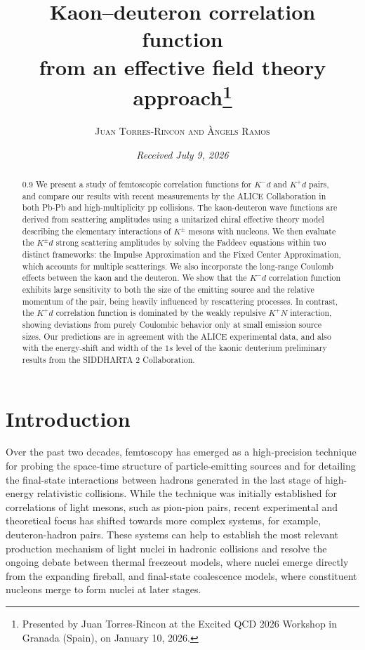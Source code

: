 \documentclass[12pt,a4paper]{article}
\title{\large \textbf{Kaon–deuteron correlation function \\ from an effective field theory approach\footnote{Presented by Juan Torres-Rincon at the Excited QCD 2026 Workshop in Granada
(Spain), on January 10, 2026.}}}
\author{\textsc{Juan Torres-Rincon and \`{A}ngels Ramos}}
\date{\normalsize \textit{Received July 9, 2026}}
\begin{document}
\maketitle
\begin{abstract}
\vspace{-4em}
\begin{spacing}{0.9}
We present a study of femtoscopic correlation functions for	$K^{-}d$ and $K^{+}d$ pairs, and compare our results with recent measurements by the ALICE Collaboration in both Pb-Pb and high-multiplicity pp collisions. The kaon-deuteron wave functions are derived from scattering amplitudes using a unitarized chiral effective theory model describing the elementary interactions of $K^{\pm}$ mesons with nucleons. We then evaluate the $K^{\pm}d$ strong scattering amplitudes by solving the Faddeev equations within two distinct frameworks: the Impulse Approximation and the Fixed Center Approximation, which accounts for multiple scatterings. We also incorporate the long-range Coulomb effects between the kaon and the deuteron. We show that the $K^{−}d$ correlation function exhibits large sensitivity to both the size of the emitting source and the relative momentum of the pair, being heavily influenced by rescattering processes. In contrast, the $K^{+}d$ correlation function is dominated by the weakly repulsive $K^{+}N$ interaction, showing
deviations from purely Coulombic behavior only at small emission source sizes. Our predictions are in agreement with the ALICE experimental data, and also with the energy-shift and width of the $1s$ level of the kaonic deuterium preliminary results from the SIDDHARTA 2 Collaboration.
\end{spacing}
\end{abstract}

\section{\normalsize {Introduction}}
Over the past two decades, femtoscopy has emerged as a high-precision technique for probing the space-time structure of particle-emitting sources and for detailing the final-state interactions between hadrons generated in the last stage of high-energy relativistic collisions. While the technique was initially established for correlations of light mesons, such as pion-pion pairs, recent experimental and theoretical focus has shifted towards more complex systems, for example, deuteron-hadron pairs. These systems can help to establish the most relevant production mechanism of light nuclei in hadronic collisions and resolve the ongoing debate between thermal freezeout models, where nuclei emerge directly from the expanding fireball, and final-state coalescence models, where constituent nucleons merge to form  nuclei at later stages. 
\end{document}
